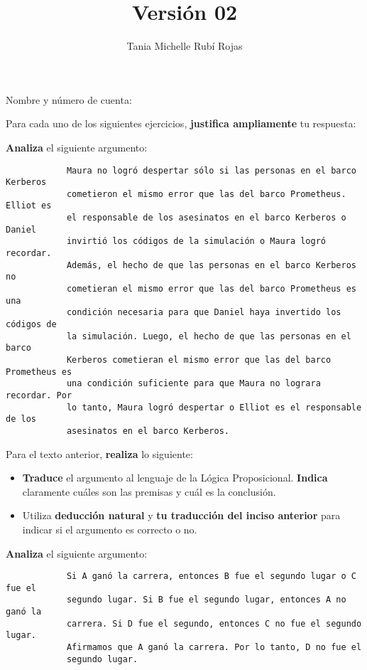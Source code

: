 \documentclass[oneside]{style}
\title{Versión 02}
\author{Tania Michelle Rubí Rojas}
\begin{document}
\maketitle

\vspace{5mm}
\noindent
Nombre y número de cuenta: \hrulefill\

\vspace*{5mm}
Para cada uno de los siguientes ejercicios, \textbf{justifica ampliamente} tu 
respuesta:

\begin{questions}[label=\protect\circled{\bfseries\arabic*}]

    \question
    {
        \textbf{Analiza} el siguiente argumento:
        \begin{verbatim}
            Maura no logró despertar sólo si las personas en el barco Kerberos
            cometieron el mismo error que las del barco Prometheus. Elliot es 
            el responsable de los asesinatos en el barco Kerberos o Daniel 
            invirtió los códigos de la simulación o Maura logró recordar.  
            Además, el hecho de que las personas en el barco Kerberos no 
            cometieran el mismo error que las del barco Prometheus es una 
            condición necesaria para que Daniel haya invertido los códigos de 
            la simulación. Luego, el hecho de que las personas en el barco 
            Kerberos cometieran el mismo error que las del barco Prometheus es 
            una condición suficiente para que Maura no lograra recordar. Por 
            lo tanto, Maura logró despertar o Elliot es el responsable de los 
            asesinatos en el barco Kerberos.   
        \end{verbatim}

        Para el texto anterior, \textbf{realiza} lo siguiente:
        \begin{itemize}
            \item \textbf{Traduce} el argumento al lenguaje de la Lógica 
            Proposicional. \textbf{Indica} claramente cuáles son las premisas 
            y cuál es la conclusión. 
            
            \item Utiliza \textbf{deducción natural} y \textbf{tu 
            traducción del inciso anterior} para indicar si el argumento es 
            correcto o no. 
        \end{itemize}
    }   
    
    \question
    {
        \textbf{Analiza} el siguiente argumento:
        \begin{verbatim}
            Si A ganó la carrera, entonces B fue el segundo lugar o C fue el 
            segundo lugar. Si B fue el segundo lugar, entonces A no ganó la 
            carrera. Si D fue el segundo, entonces C no fue el segundo lugar. 
            Afirmamos que A ganó la carrera. Por lo tanto, D no fue el 
            segundo lugar. 
        \end{verbatim}

}
\end{questions}
\end{document}
